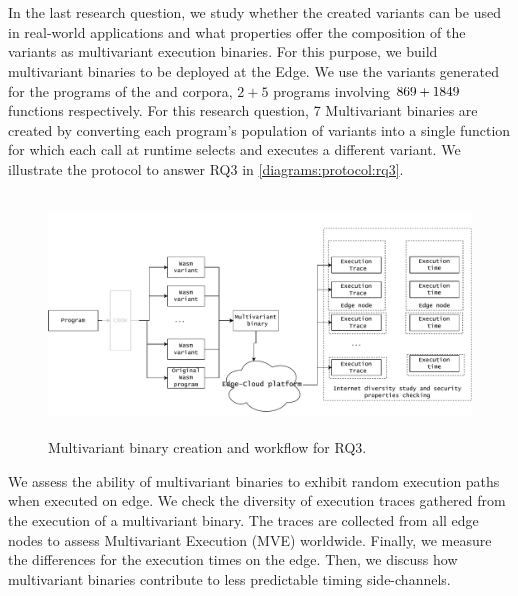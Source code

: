 
\section{\rqthree}
\label{rq3:method}

\newcommand{\mewe}{MEWE\xspace}

In the last research question, we study whether the created variants can be used in real-world applications and what properties offer the composition of the variants as multivariant execution binaries. For this purpose, we build multivariant binaries to be deployed at the Edge. We use the variants generated for the programs of the \corpussodium and \corpusqrcode corpora, $2 + 5$ programs involving $ 869 + 1849$ functions respectively. For this research question, 7 Multivariant binaries are created by converting each program's population of variants into a single function for which each call at runtime selects and executes a different variant. We illustrate the protocol to answer RQ3 in \autoref{diagrams:protocol:rq3}.




\begin{figure}[h]
    \centering
    \includegraphics[height=2.50in]{diagrams/Rq3.pdf}
    \caption{Multivariant binary creation and workflow for RQ3.}
    \label{diagrams:protocol:rq3}
\end{figure}

We assess the ability of multivariant binaries to exhibit random execution paths when executed on edge. We check the diversity of execution traces gathered from the execution of a multivariant binary. The traces are collected from all edge nodes to assess Multivariant Execution (MVE) worldwide. Finally, we measure the differences for the execution times on the edge. Then, we discuss how multivariant binaries contribute to less predictable timing side-channels.

